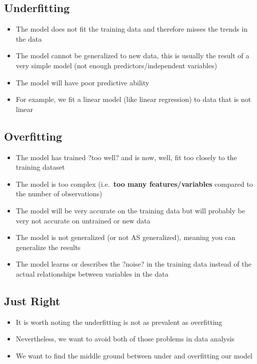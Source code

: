 \documentclass[
]{book}
\providecommand{\tightlist}{%
  \setlength{\itemsep}{0pt}\setlength{\parskip}{0pt}}
\begin{document}
\hypertarget{underfitting}{%
\subsection{Underfitting}\label{underfitting}}

\begin{itemize}
\tightlist
\item
  The model does not fit the training data and therefore misses the trends in the data
\item
  The model cannot be generalized to new data, this is usually the result of a very simple model (not enough predictors/independent variables)
\item
  The model will have poor predictive ability
\item
  For example, we fit a linear model (like linear regression) to data that is not linear
\end{itemize}

\hypertarget{overfitting}{%
\subsection{Overfitting}\label{overfitting}}

\begin{itemize}
\tightlist
\item
  The model has trained ?too well? and is now, well, fit too closely to the training dataset
\item
  The model is too complex (i.e.~\textbf{too many features/variables} compared to the number of observations)
\item
  The model will be very accurate on the training data but will probably be very not accurate on untrained or new data
\item
  The model is not generalized (or not AS generalized), meaning you can generalize the results
\item
  The model learns or describes the ?noise? in the training data instead of the actual relationships between variables in the data
\end{itemize}

\hypertarget{just-right}{%
\subsection{Just Right}\label{just-right}}

\begin{itemize}
\tightlist
\item
  It is worth noting the underfitting is not as prevalent as overfitting
\item
  Nevertheless, we want to avoid both of those problems in data analysis
\item
  We want to find the middle ground between under and overfitting our model
\end{itemize}
\end{document}
